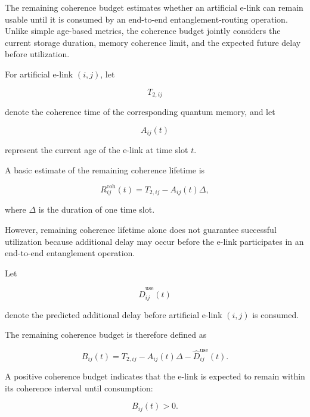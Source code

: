 The remaining coherence budget estimates whether an artificial e-link can remain usable until it is consumed by an end-to-end entanglement-routing operation. Unlike simple age-based metrics, the coherence budget jointly considers the current storage duration, memory coherence limit, and the expected future delay before utilization.

For artificial e-link $(i,j)$, let

\begin{equation}
    T_{2,ij}
\end{equation}

denote the coherence time of the corresponding quantum memory, and let

\begin{equation}
    A_{ij}(t)
\end{equation}

represent the current age of the e-link at time slot $t$.

A basic estimate of the remaining coherence lifetime is

\begin{equation}
    R_{ij}^{\mathrm{coh}}(t)
    =
    T_{2,ij}
    -
    A_{ij}(t)\Delta,
\end{equation}

where $\Delta$ is the duration of one time slot.

However, remaining coherence lifetime alone does not guarantee successful utilization because additional delay may occur before the e-link participates in an end-to-end entanglement operation.

Let

\begin{equation}
    \widehat{D}_{ij}^{\mathrm{use}}(t)
\end{equation}

denote the predicted additional delay before artificial e-link $(i,j)$ is consumed.

The remaining coherence budget is therefore defined as

\begin{equation}
    B_{ij}(t)
    =
    T_{2,ij}
    -
    A_{ij}(t)\Delta
    -
    \widehat{D}_{ij}^{\mathrm{use}}(t).
\end{equation}

A positive coherence budget indicates that the e-link is expected to remain within its coherence interval until consumption:

\begin{equation}
    B_{ij}(t)>0.
\end{equation}


